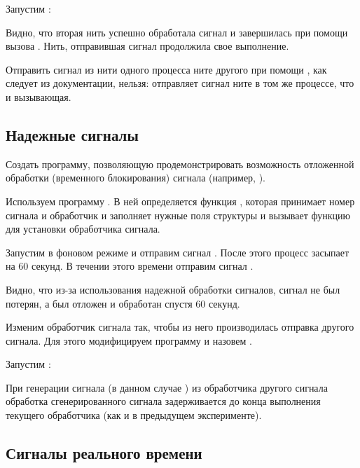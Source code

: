 
Запустим :


Видно, что вторая нить успешно обработала сигнал и завершилась при помощи вызова . Нить, отправившая сигнал продолжила свое выполнение.

Отправить сигнал из нити одного процесса ните другого при помощи , как следует из документации, нельзя:  отправляет сигнал ните в том же процессе, что и вызывающая.

\subsection{Надежные сигналы}

Создать программу, позволяющую продемонстрировать возможность отложенной обработки (временного блокирования) сигнала (например, ).

Используем программу . В ней определяется функция , которая принимает номер сигнала и обработчик и заполняет нужные поля структуры  и вызывает функцию  для установки обработчика сигнала.


Запустим  в фоновом режиме и отправим сигнал . После этого процесс засыпает на 60 секунд. В течении этого времени отправим сигнал .


Видно, что из-за использования надежной обработки сигналов, сигнал  не был потерян, а был отложен и обработан спустя 60 секунд.

Изменим обработчик сигнала так, чтобы из него производилась отправка другого сигнала. Для этого модифицируем программу  и назовем .


Запустим :


При генерации сигнала (в данном случае ) из обработчика другого
сигнала обработка сгенерированного сигнала задерживается до конца
выполнения текущего обработчика (как и в предыдущем эксперименте).

\subsection{Сигналы реального времени}

